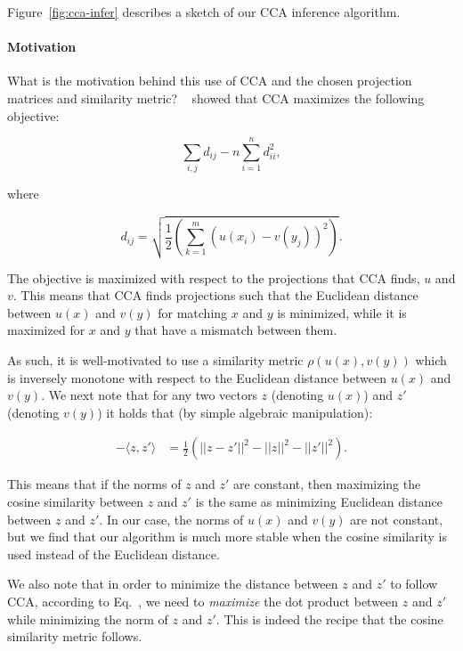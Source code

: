 \documentclass[letterpaper]{article}
\newcommand{\newcite}[1]{\citeauthor{#1}~\shortcite{#1}}
\begin{document}
Figure~\ref{fig:cca-infer} describes a sketch of our CCA inference algorithm.

\paragraph{Motivation} What is the motivation behind this use of CCA and the chosen projection matrices and similarity
metric? \newcite{osborne-16} showed that CCA maximizes the following objective:

\begin{equation}
\sum_{i,j} d_{ij} - n \sum_{i=1}^n d_{ii}^2,
\end{equation}

\noindent where

\begin{equation}
d_{ij} = \sqrt{\displaystyle\frac{1}{2} \left( \sum_{k=1}^m (u(x_i) - v(y_j))^2 \right)}.
\end{equation}

The objective is maximized with respect to the projections that CCA finds, $u$ and $v$.
This means that CCA finds projections such that the Euclidean distance between
$u(x)$ and $v(y)$ for matching $x$ and $y$ is minimized, while it is maximized for $x$ and $y$
that have a mismatch between them.

As such, it is well-motivated to use a similarity metric $\rho(u(x),v(y))$ which is inversely monotone with
respect to the Euclidean distance between $u(x)$ and $v(y)$.
We next note that for any two vectors $z$ (denoting $u(x)$) and $z'$ (denoting $v(y)$) it holds
that (by simple algebraic manipulation):

\begin{align}
- \langle z, z' \rangle & = \frac{1}{2} \left( || z - z'||^2 - || z||^2 - ||z'||^2 \right). \label{eq:aa}
\end{align}

This means that if the norms of $z$ and $z'$ are constant, then maximizing the cosine similarity
between $z$ and $z'$ is the same as minimizing Euclidean distance between $z$ and $z'$.
In our case, the norms of $u(x)$ and $v(y)$ are not constant, but we find that our algorithm is
much more stable when the cosine similarity is used instead of the Euclidean distance.

We also note that in order to minimize the distance between $z$ and $z'$ to follow CCA, according
to Eq.~, we need to {\em maximize} the dot product between $z$ and $z'$ while minimizing
the norm of $z$ and $z'$. This is indeed the recipe that the cosine similarity metric follows.
\end{document}
